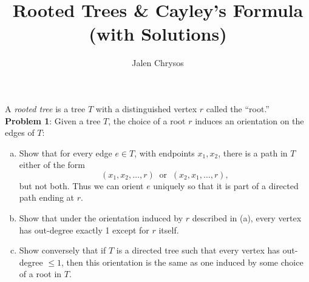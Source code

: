 \documentclass{amsart}
\author{Jalen Chrysos}
\title{Rooted Trees \& Cayley's Formula (with Solutions)}
\begin{document}
	\maketitle 
	
	
	
	A \textit{rooted tree} is a tree $T$ with a distinguished vertex $r$ called the ``root.'' \\
	
	\noindent \textbf{Problem 1}: Given a tree $T$, the choice of a root $r$ induces an orientation on the edges of $T$: 
	\begin{enumerate}[(a)]
		\item Show that for every edge $e\in T$, with endpoints $x_1,x_2$, there is a path in $T$ either of the form
		$$(x_1,x_2,\dots,r) \;\; \text{or} \;\; (x_2,x_1,\dots,r),$$
		but not both. Thus we can orient $e$ uniquely so that it is part of a directed path ending at $r$.
		\item Show that under the orientation induced by $r$ described in (a), every vertex has out-degree exactly 1 except for $r$ itself.
		\item Show conversely that if $T$ is a directed tree such that every vertex has out-degree $\leq 1$, then this orientation is the same as one induced by some choice of a root in $T$.\\
	\end{enumerate} 
	
\end{document}
